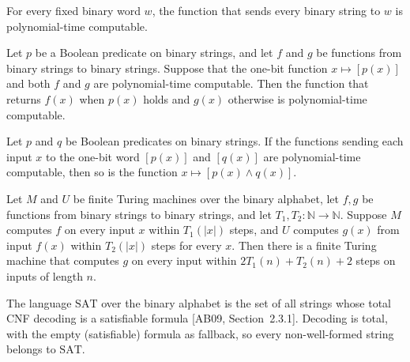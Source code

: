\begin{lemma}
\label{Complexity.sat_pt_const}
\leanok
{}
For every fixed binary word $w$, the function that sends every binary string to $w$ is
polynomial-time computable.
\end{lemma}

\begin{lemma}
\label{Complexity.sat_pt_cond}
\leanok
{}
Let $p$ be a Boolean predicate on binary strings, and let $f$ and $g$ be functions from
binary strings to binary strings. Suppose that the one-bit function $x\mapsto[p(x)]$ and
both $f$ and $g$ are polynomial-time computable. Then the function that returns $f(x)$
when $p(x)$ holds and $g(x)$ otherwise is polynomial-time computable.
\end{lemma}

\begin{lemma}
\label{Complexity.sat_pt_and}
\leanok
{}
Let $p$ and $q$ be Boolean predicates on binary strings. If the functions sending each
input $x$ to the one-bit word $[p(x)]$ and $[q(x)]$ are polynomial-time computable, then
so is the function $x\mapsto[p(x)\wedge q(x)]$.
\end{lemma}

\begin{lemma}
\label{Complexity.sat_comp_on_image}
\leanok
{}
Let $M$ and $U$ be finite Turing machines over the binary alphabet, let $f,g$ be
functions from binary strings to binary strings, and let $T_1,T_2 : \mathbb{N} \to
\mathbb{N}$. Suppose $M$ computes $f$ on every input $x$ within $T_1(|x|)$ steps, and
$U$ computes $g(x)$ from input $f(x)$ within $T_2(|x|)$ steps for every $x$. Then there
is a finite Turing machine that computes $g$ on every input within $2T_1(n)+T_2(n)+2$
steps on inputs of length $n$.
\end{lemma}

\begin{definition}
\label{Complexity.SAT}
\leanok
{}
The language $\mathrm{SAT}$ over the binary alphabet is the set of all strings
whose total CNF decoding is a satisfiable formula [AB09, Section~2.3.1]. Decoding
is total, with the empty (satisfiable) formula as fallback, so every
non-well-formed string belongs to $\mathrm{SAT}$.
\end{definition}

